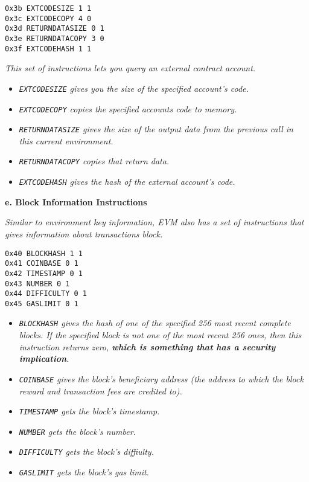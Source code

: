 \begin{lstlisting}[language=Solidity,numbers=none]
0x3b EXTCODESIZE 1 1
0x3c EXTCODECOPY 4 0
0x3d RETURNDATASIZE 0 1
0x3e RETURNDATACOPY 3 0
0x3f EXTCODEHASH 1 1
\end{lstlisting}

\emph{This set of instructions lets you query an external contract
account.}

\begin{itemize}
\tightlist
\item
  \emph{\texttt{EXTCODESIZE} gives you the size of the specified
  account's code.}
\item
  \emph{\texttt{EXTCODECOPY} copies the specified accounts code to
  memory.}
\item
  \emph{\texttt{RETURNDATASIZE} gives the size of the output data from
  the previous call in this current environment.}
\item
  \emph{\texttt{RETURNDATACOPY} copies that return data.}
\item
  \emph{\texttt{EXTCODEHASH} gives the hash of the external account's
  code.}
\end{itemize}

\hfill\break
\textbf{e. Block Information Instructions}

\emph{Similar to environment key information, EVM also has a set of
instructions that gives information about transactions block.}

\begin{lstlisting}[language=Solidity,numbers=none]
0x40 BLOCKHASH 1 1
0x41 COINBASE 0 1
0x42 TIMESTAMP 0 1
0x43 NUMBER 0 1
0x44 DIFFICULTY 0 1
0x45 GASLIMIT 0 1
\end{lstlisting}

\begin{itemize}
\tightlist
\item
  \emph{\texttt{BLOCKHASH} gives the hash of one of the specified 256
  most recent complete blocks. If the specified block is not one of the
  most recent 256 ones, then this instruction returns zero,
  \textbf{which is something that has a security implication}.}
\item
  \emph{\texttt{COINBASE} gives the block's beneficiary address (the
  address to which the block reward and transaction fees are credited
  to).}
\item
  \emph{\texttt{TIMESTAMP} gets the block's timestamp.}
\item
  \emph{\texttt{NUMBER} gets the block's number.}
\item
  \emph{\texttt{DIFFICULTY} gets the block's diffiulty.}
\item
  \emph{\texttt{GASLIMIT} gets the block's gas limit.}
\end{itemize}

